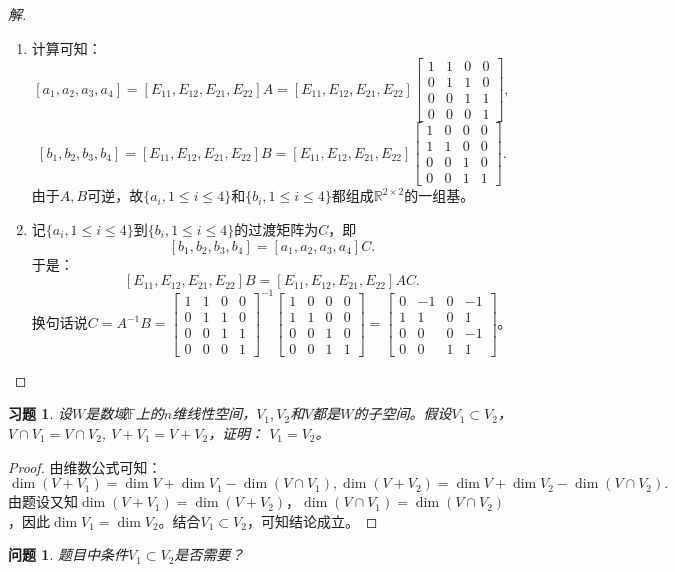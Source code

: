 \documentclass[UTF8]{ctexart}
\newtheorem{ques}[thm]{问题}
\newtheorem{ex}[thm]{习题}
\begin{document}
\begin{proof}[解]
\begin{enumerate}
\item
计算可知：
\[
[a_1, a_2, a_3, a_4] = [E_{11}, E_{12}, E_{21}, E_{22}] A = [E_{11}, E_{12}, E_{21}, E_{22}] \begin{bmatrix}
1 & 1 & 0 & 0  \\
0 & 1 & 1 & 0  \\
0 & 0 & 1 & 1 \\
0 & 0 & 0 & 1 
\end{bmatrix},
\]
\[
[b_1, b_2, b_3, b_4] = [E_{11}, E_{12}, E_{21}, E_{22}] B = [E_{11}, E_{12}, E_{21}, E_{22}] \begin{bmatrix}
1 & 0 & 0 & 0  \\
1 & 1 & 0 & 0  \\
0 & 0 & 1 & 0 \\
0 & 0 & 1 & 1 
\end{bmatrix}.
\]
由于$A, B$可逆，故$\{a_{i}, 1 \leq i \leq 4\}$和$\{b_{i}, 1 \leq i \leq 4\}$都组成$\mathbb{R}^{2 \times 2}$的一组基。
\item
记$\{a_{i}, 1 \leq i \leq 4\}$到$\{b_{i}, 1 \leq i \leq 4\}$的过渡矩阵为$C$，即
\[
[b_1, b_2, b_3, b_4] = [a_1, a_2, a_3, a_4]C.
\]
于是：
\[
[E_{11}, E_{12}, E_{21}, E_{22}] B = [E_{11}, E_{12}, E_{21}, E_{22}] A C. 
\]
换句话说$C = A^{-1}B = \begin{bmatrix}
1 & 1 & 0 & 0  \\
0 & 1 & 1 & 0  \\
0 & 0 & 1 & 1 \\
0 & 0 & 0 & 1 
\end{bmatrix}^{-1} \begin{bmatrix}
1 & 0 & 0 & 0  \\
1 & 1 & 0 & 0  \\
0 & 0 & 1 & 0 \\
0 & 0 & 1 & 1 
\end{bmatrix} = \begin{bmatrix}
0 & -1 & 0 & -1  \\
1 & 1 & 0 & 1  \\
0 & 0 & 0 & -1 \\
0 & 0 & 1 & 1 
\end{bmatrix}$。
\end{enumerate}
\end{proof}
\begin{ex} 
设$W$是数域$\mathbb{F}$上的$n$维线性空间，$V_1, V_2$和$V$都是$W$的子空间。假设$V_1 \subset V_2$，$V\cap V_1 = V\cap V_2$, $V+ V_1=V+V_2$，证明：
$V_1 = V_2$。
\end{ex}
\begin{proof}
由维数公式可知：
\[
\dim(V+ V_1) = \dim V + \dim V_1 - \dim(V \cap V_1), \dim(V+ V_2) = \dim V + \dim V_2 - \dim(V\cap V_2).
\]
由题设又知$\dim(V+V_1) = \dim(V+V_2)$，$\dim(V\cap V_1) = \dim(V\cap V_2)$，因此$\dim V_1 = \dim V_2$。结合$V_1 \subset V_2$，可知结论成立。
\end{proof}
\begin{ques}
题目中条件$V_1 \subset V_2$是否需要？
\end{ques}
\end{document}
